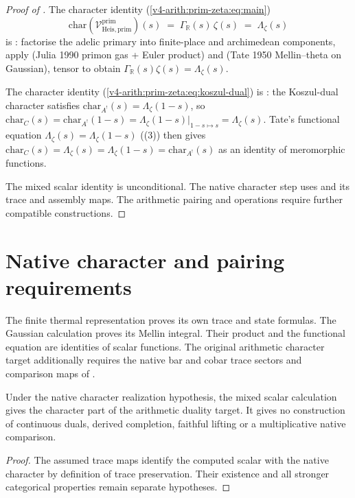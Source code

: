 \begin{proof}[Proof of ]
The character identity
(\ref{v4-arith:prim-zeta:eq:main})
\begin{equation*}
\mathrm{char}(\mathcal{V}^{\mathrm{prim}}_{\mathrm{Heis},\mathrm{prim}})(s)
\;=\;\Gamma_{\mathbb{R}}(s)\,\zeta(s)\;=\;\Lambda_{\zeta}(s)
\end{equation*}
is : factorise the adelic
primary into finite-place and archimedean components, apply
 (Julia 1990 primon gas
+ Euler product) and
 (Tate 1950 Mellin--theta on
Gaussian), tensor to obtain
\(\Gamma_{\mathbb{R}}(s)\zeta(s)=\Lambda_{\zeta}(s)\).

The character identity
(\ref{v4-arith:prim-zeta:eq:koszul-dual})
is : the Koszul-dual
character satisfies \(\mathrm{char}_{A^{!}}(s)=\Lambda_{\zeta}(1-s)\), so
\(\mathrm{char}_{C}(s)=\mathrm{char}_{A^{!}}(1-s)=\Lambda_{\zeta}(1-s)\big|_{1-s\mapsto s}=\Lambda_{\zeta}(s)\).
Tate's functional equation \(\Lambda_{\zeta}(s)=\Lambda_{\zeta}(1-s)\)
((3)) then gives
\(\mathrm{char}_{C}(s)=\Lambda_{\zeta}(s)=\Lambda_{\zeta}(1-s)=\mathrm{char}_{A^{!}}(s)\)
as an identity of meromorphic functions.

The mixed scalar identity is unconditional. The native character
step uses  and its
trace and assembly maps. The arithmetic pairing and operations require
further compatible constructions.
\end{proof}

\section{Native character and pairing requirements}
\label{v4-arith:prim-zeta:consequence-p1}
\label{v4-arith:prim-zeta:reduction-sub-items}

The finite thermal representation proves its own trace and state
formulas. The Gaussian calculation proves its Mellin integral. Their
product and the functional equation are identities of scalar functions.
The original arithmetic character target additionally requires the
native bar and cobar trace sectors and comparison maps of
.

\begin{corollary}
\label{v4-arith:prim-zeta:cor:p1-residual-reduced}
Under the native character realization hypothesis, the mixed scalar
calculation gives the character part of the arithmetic duality target.
It gives no construction of continuous duals, derived completion,
faithful lifting or a multiplicative native comparison.
\end{corollary}
\begin{proof}
The assumed trace maps identify the computed scalar with the native
character by definition of trace preservation. Their existence and all
stronger categorical properties remain separate hypotheses.
\end{proof}

